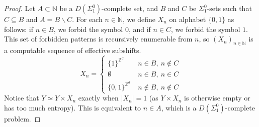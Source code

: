 \documentclass[10pt,a4paper]{amsart}
\newcommand{\N}{\mathbb{N}}
\newcommand{\Z}{\mathbb{Z}}
\begin{document}
\begin{proof}
Let $A\subset\N$ be a $D(\Sigma_1^0)$-complete set, and $B$ and $C$ be $\Sigma_1^0$-sets such that $C\subseteq B$ and $A=B\smallsetminus C$. 
For each $n\in\N$, we define $X_n$ on alphabet $\{0,1\}$ as follows: if $n\in B$, we forbid the symbol $0$, and if $n\in C$, we forbid the symbol $1$. This set of forbidden patterns is recursively enumerable from $n$, so $(X_n)_{n\in \N}$ is a computable sequence of effective subshifts.
\[X_n=\begin{cases}
\{1\}^{\Z^d} &\ n\in B, \ n\notin C\\
\emptyset &\ n \in B, \  n\in C \\
\{0,1\}^{\mathbb{Z}^d} &\ n\notin B, \ n\notin C
\end{cases}\]
Notice that $Y\simeq Y\times X_n$ exactly when $|X_n|=1$ (as $Y\times X_n$ is otherwise empty or has too much entropy). This is equivalent to $n\in A$, which is a $D(\Sigma_1^0)$-complete problem. 
\end{proof}
\end{document}

